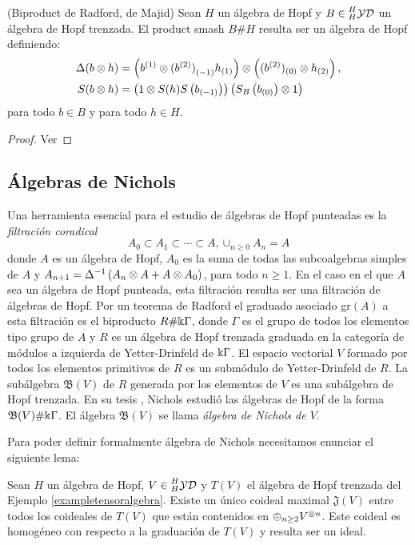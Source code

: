 \documentclass[a4paper,oneside,fleqn,11pt,../tesis.tex]{subfiles}
\newcommand{\yetter}{\prescript{H}{H}{\mathcal{YD}}}
\begin{document}
\begin{prop} (Biproduct de Radford,  de Majid) Sean $H$ un álgebra de Hopf y $B \in \yetter$ un álgebra de Hopf trenzada.
	El product smash $B\#H$ resulta ser un álgebra de Hopf definiendo:
	\begin{align*}
		\Delta(b \otimes h) &= \left( b^{(1)}\otimes {(b^{(2)})}_{(-1)} h_{(1)} \right) \otimes \left( (b^{(2)})_{(0)} \otimes h_{(2)} \right),\\	
		S(b \otimes h) &= \left(1 \otimes S(h) S\left( b_{(-1)}\right) \right) \left(S_B\left(b_{(0)}\right) \otimes 1\right)
	\end{align*}
	para todo $b \in B$ y para todo $h \in H$.
\end{prop}
\begin{proof}
	Ver  
\end{proof}

\subsection{Álgebras de Nichols}

Una herramienta esencial para el estudio de álgebras de Hopf punteadas es la \emph{filtración coradical}
\[
	A_0 \subset A_1 \subset \cdots \subset A, \cup_{n \geq 0}A_n = A
\]
donde $A$ es un álgebra de Hopf, $A_0$ es la suma de todas las subcoalgebras simples de $A$ y
$A_{n + 1} = \Delta^{-1}\left( A_n \otimes A + A \otimes A_0\right)$, para todo $n \geq 1$.
En el caso en el que $A$ sea un álgebra de Hopf punteada, esta filtración
resulta ser una filtración de álgebras de Hopf. Por un teorema de Radford \myworries{[Ra]} el graduado
asociado gr$(A)$ a esta filtración es el biproducto $R\#\Bbbk\Gamma$, donde $\Gamma$ es el grupo de todos los elementos tipo
grupo de $A$ y $R$ es un álgebra de Hopf trenzada graduada en la categoría de módulos a izquierda de Yetter-Drinfeld  de $\Bbbk\Gamma$.
El espacio vectorial $V$ formado por todos los elementos primitivos de $R$ es un submódulo de Yetter-Drinfeld de $R$.
La subálgebra $\mathfrak{B}(V)$ de $R$ generada por los elementos de $V$ es una subálgebra de Hopf trenzada.
En su tesis \myworries{[N]}, Nichols estudió las álgebras de Hopf de la forma $\mathfrak{B}(V) \# \Bbbk\Gamma$.
El álgebra $\mathfrak{B}(V)$ se llama \emph{álgebra de Nichols de $V$}.

Para poder definir formalmente álgebra de Nichols necesitamos enunciar el siguiente lema:
\begin{lema}
	Sean $H$ un álgebra de Hopf, $V \in \yetter$ y $T(V)$ el álgebra de Hopf trenzada del Ejemplo \ref{exampletensoralgebra}.
	Existe un único coideal maximal $\mathfrak{J}(V)$ entre todos los coideales de $T(V)$ que están contenidos en $\oplus_{n \geq 2}V^{\otimes n}$. Este coideal es homogéneo con respecto a la graduación de $T(V)$ y resulta ser un ideal.
\end{lema}
\end{document}
